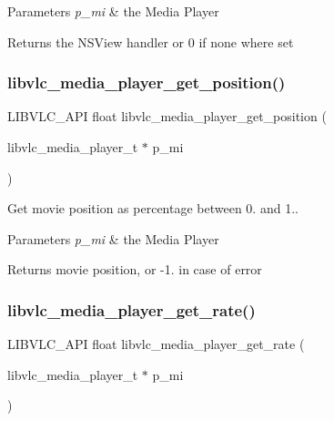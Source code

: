 \begin{DoxyParams}{Parameters}
{\em p\+\_\+mi} & the Media Player \\
\hline
\end{DoxyParams}
\begin{DoxyReturn}{Returns}
the N\+S\+View handler or 0 if none where set 
\end{DoxyReturn}
\mbox{\label{group__libvlc__media__player_gaa6ee9d95f5b6ee0c34b92ab8c86a5c1c}} 
\subsubsection{\texorpdfstring{libvlc\+\_\+media\+\_\+player\+\_\+get\+\_\+position()}{libvlc\_media\_player\_get\_position()}}
{\footnotesize\ttfamily L\+I\+B\+V\+L\+C\+\_\+\+A\+PI float libvlc\+\_\+media\+\_\+player\+\_\+get\+\_\+position (\begin{DoxyParamCaption}\item[{libvlc\+\_\+media\+\_\+player\+\_\+t $\ast$}]{p\+\_\+mi }\end{DoxyParamCaption})}

Get movie position as percentage between 0. and 1..


\begin{DoxyParams}{Parameters}
{\em p\+\_\+mi} & the Media Player \\
\hline
\end{DoxyParams}
\begin{DoxyReturn}{Returns}
movie position, or -\/1. in case of error 
\end{DoxyReturn}
\mbox{\label{group__libvlc__media__player_ga1ae5393783c03bd23a6b0c198aacf3cd}} 
\subsubsection{\texorpdfstring{libvlc\+\_\+media\+\_\+player\+\_\+get\+\_\+rate()}{libvlc\_media\_player\_get\_rate()}}
{\footnotesize\ttfamily L\+I\+B\+V\+L\+C\+\_\+\+A\+PI float libvlc\+\_\+media\+\_\+player\+\_\+get\+\_\+rate (\begin{DoxyParamCaption}\item[{libvlc\+\_\+media\+\_\+player\+\_\+t $\ast$}]{p\+\_\+mi }\end{DoxyParamCaption})}

